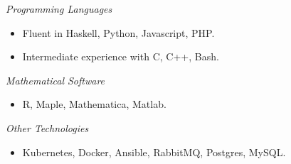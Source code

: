 \documentclass[11pt,article,oneside]{memoir}
\begin{document}

\bigskip



\ind \emph{Programming Languages}
\small
\begin{itemize}
  \item Fluent in Haskell, Python, Javascript, PHP.
  \item Intermediate experience with C, C++, Bash.
\end{itemize}
\normalsize

\ind \emph{Mathematical Software}
\small
\begin{itemize}
  \item R, Maple, Mathematica, Matlab.
\end{itemize}
\normalsize

\ind \emph{Other Technologies}
\small
\begin{itemize}
  \item Kubernetes, Docker, Ansible, RabbitMQ, Postgres, MySQL.
\end{itemize}
\normalsize
\end{document}
